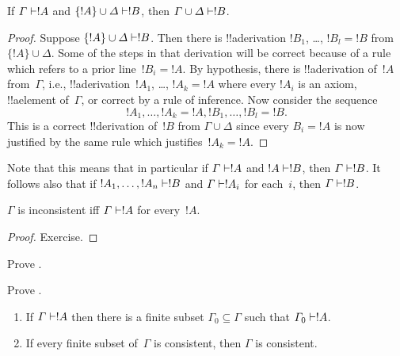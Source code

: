 \documentclass[../../../include/open-logic-section]{subfiles}
\begin{document}
\begin{prop}[Transitivity]
If $\Gamma \Proves !A$ and $\{!A\} \cup \Delta \Proves
!B$, then $\Gamma \cup \Delta \Proves !B$.
\end{prop}

\begin{proof}
  Suppose $\{!A\} \cup \Delta \Proves !B$. Then there is
  !!a{derivation} $!B_1$, \dots, $!B_l = !B$ from~$\{!A\} \cup
  \Delta$. Some of the steps in that derivation will be correct
  because of a rule which refers to a prior line~$!B_i = !A$. By
  hypothesis, there is !!a{derivation} of~$!A$ from~$\Gamma$, i.e.,
  !!a{derivation}~$!A_1$, \dots, $!A_k = !A$ where every $!A_i$ is an
  axiom, !!a{element} of~$\Gamma$, or correct by a rule of
  inference. Now consider the sequence
  \[
  !A_1, \dots, !A_k = !A, !B_1, \dots, !B_l = !B.
  \]
  This is a correct !!{derivation} of~$!B$ from $\Gamma \cup \Delta$
  since every $B_i = !A$ is now justified by the same rule which
  justifies~$!A_k = !A$.
\end{proof}

Note that this means that in particular if $\Gamma \Proves !A$ and $!A
\Proves !B$, then $\Gamma \Proves !B$. It follows also that if $!A_1,
\dots, !A_n \Proves !B$ and $\Gamma \Proves !A_i$ for each~$i$, then
$\Gamma \Proves !B$.

\begin{prop}
$\Gamma$ is inconsistent iff $\Gamma \Proves !A$ for every~$!A$.
\end{prop}

\begin{proof}
Exercise.
\end{proof}

\begin{prob}
Prove .
\end{prob}
\tagendprob

\begin{prob}
Prove .
\end{prob}
\tagendprob

\begin{prop}[Compactness]
  \begin{enumerate}
  \item If $\Gamma \Proves !A$ then there is a finite subset $\Gamma_0
    \subseteq \Gamma$ such that $\Gamma_0 \Proves !A$.
  \item If every finite subset of~$\Gamma$ is
    consistent, then $\Gamma$ is consistent.
  \end{enumerate}
\end{prop}
\end{document}
